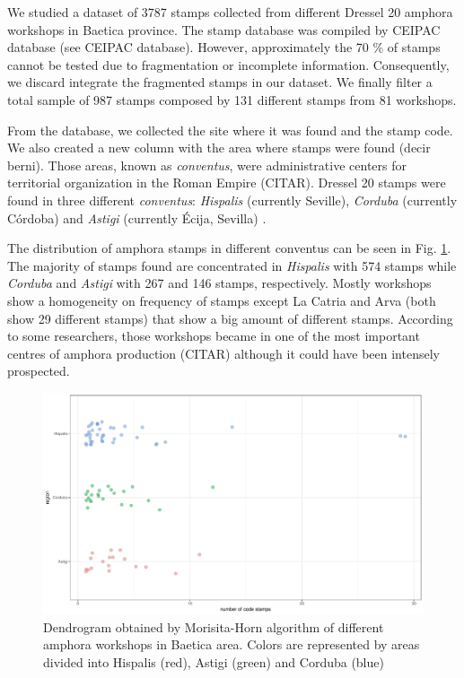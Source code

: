 \documentclass[review]{elsarticle}
\begin{document}
We studied a dataset of 3787 stamps collected from different Dressel 20 amphora workshops in Baetica province. The stamp database was compiled by CEIPAC database \citep{remesal_centro_2015} (see CEIPAC database). However, approximately the 70 \% of stamps cannot be tested due to fragmentation or incomplete information. Consequently, we discard integrate the fragmented stamps in our dataset. We finally filter a total sample of 987 stamps composed by 131 different stamps from 81 workshops. 

From the database, we collected the site where it was found and the stamp code. We also created a new column with the area where stamps were found (decir berni). Those areas, known as \textit{conventus}, were administrative centers for territorial organization in the Roman Empire (CITAR). Dressel 20 stamps were found in three different \textit{conventus}: \textit{Hispalis} (currently Seville), \textit{Corduba} (currently C\'ordoba) and \textit{Astigi} (currently Écija, Sevilla) \citep{rodriguez_economioleicola_1977,chic_datos_2001,berni_millet_epigrafianforica_2008} .

The distribution of amphora stamps in different conventus can be seen in Fig. \ref{frequency}. The majority of stamps found are concentrated in \textit{Hispalis} with 574 stamps while \textit{Corduba} and \textit{Astigi} with 267 and 146 stamps, respectively. Mostly workshops show a homogeneity on frequency of stamps except La Catria and Arva (both show 29 different stamps) that show a big amount of different stamps. According to some researchers, those workshops became in one of the most important centres of amphora production (CITAR) although it could have been intensely prospected. \citep{arva_1997}
 
\begin{figure}[htp]
	\centering
\includegraphics[width=\linewidth]{figs/frequency}
\caption{Dendrogram obtained by Morisita-Horn algorithm of different amphora workshops in Baetica area. Colors are represented by areas divided into Hispalis (red), Astigi (green) and Corduba (blue)}
\label{frequency}
\end{figure} 
\end{document}
